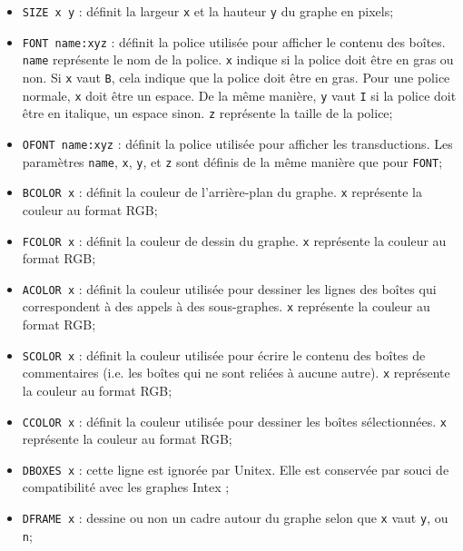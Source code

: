 \begin{itemize}
  \item \verb+SIZE x y+ : définit la largeur  \verb+x+ et la hauteur \verb+y+ du graphe en pixels;
  
  \item \verb+FONT name:xyz+ : définit la police utilisée pour afficher le contenu des boîtes.
  	  \verb+name+ représente le nom de la police. \verb+x+ indique si la police doit être en
  	  gras ou non. Si \verb+x+ vaut \verb+B+, cela indique que la police doit être en gras. Pour
  	  une police normale, \verb+x+ doit être un espace. De la même manière, \verb+y+ vaut
  	  \verb+I+ si la police doit être en italique, un espace sinon. \verb+z+ représente la
  	  taille de la police;

  \item \verb+OFONT name:xyz+ : définit la police utilisée pour afficher les transductions. Les
  	  paramètres \verb+name+, \verb+x+, \verb+y+, et \verb+z+ sont définis de la même manière
  	  que pour \verb+FONT+;
  
  \item \verb+BCOLOR x+ : définit la couleur de l’arrière-plan du graphe. \verb+x+ représente la
  	  couleur au format RGB;
  \item \verb+FCOLOR x+ : définit la couleur de dessin du graphe. \verb+x+ représente la couleur au
  	  format RGB;

  \item \verb+ACOLOR x+ : définit la couleur utilisée pour dessiner les lignes des boîtes qui
  	  correspondent à des appels à des sous-graphes. \verb+x+ représente la couleur au format
  	  RGB;

  \item \verb+SCOLOR x+ : définit la couleur utilisée pour écrire le contenu des boîtes de
  	  commentaires (i.e. les boîtes qui ne sont reliées à aucune autre). \verb+x+ représente la
  	  couleur au format RGB;

  \item \verb+CCOLOR x+ : définit la couleur utilisée pour dessiner les boîtes sélectionnées. 
  \verb+x+ représente la couleur au format RGB;

  \item \verb+DBOXES x+ : cette ligne est ignorée par Unitex. Elle est conservée par souci de
  	  compatibilité avec les graphes Intex ;

  \item \verb+DFRAME x+ : dessine ou non un cadre autour du graphe selon que \verb+x+ vaut
  	  \verb+y+, ou \verb+n+;


\end{itemize}
